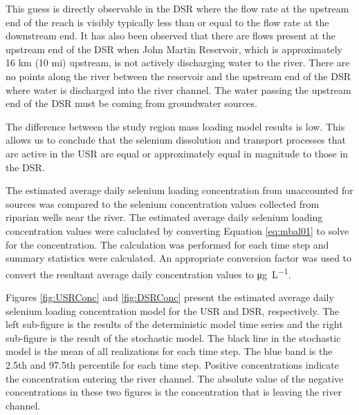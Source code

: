 \begin{linenumbers}
This guess is directly observable in the DSR where the flow rate at the upstream end of the reach is visibly typically less than or equal to the flow rate at the downstream end.  It has also been observed that there are flows present at the upstream end of the DSR when John Martin Reservoir, which is approximately 16 km (10 mi) upstream, is not actively discharging water to the river.  There are no points along the river between the reservoir and the upstream end of the DSR where water is discharged into the river channel.  The water passing the upstream end of the DSR must be coming from groundwater sources.

The difference between the study region mass loading model results is low.  This allows us to conclude that the selenium dissolution and transport processes that are active in the USR are equal or approximately equal in magnitude to those in the DSR.


The estimated average daily selenium loading concentration from unaccounted for sources was compared to the selenium concentration values collected from riparian wells near the river.  The estimated average daily selenium loading concentration values were caluclated by converting Equation \ref{eq:mbal01} to solve for the concentration.  The calculation was performed for each time step and summary statistics were calculated.  An appropriate conversion factor was used to convert the resultant average daily concentration values to \si{\micro\g\per\liter}.

Figures \ref{fig:USRConc} and \ref{fig:DSRConc} present the estimated average daily selenium loading concentration model for the USR and DSR, respectively.  The left sub-figure is the results of the deterministic model time series and the right sub-figure is the result of the stochastic model.  The black line in the stochastic model is the mean of all realizations for each time step.  The blue band is the 2.5th and 97.5th percentile for each time step.  Positive concentrations indicate the concentration entering the river channel.  The absolute value of the negative concentrations in these two figures is the concentration that is leaving the river channel.


\end{linenumbers}

